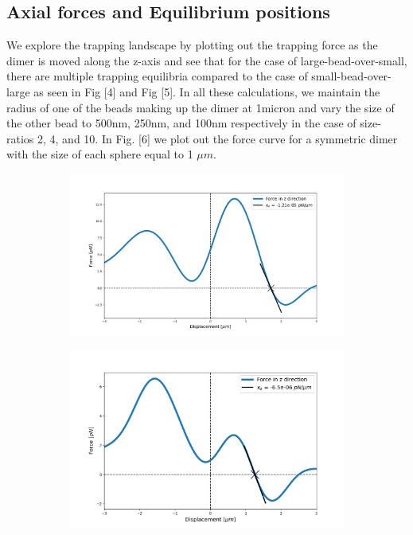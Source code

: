 \documentclass[preprint,  3p]{elsarticle}
\begin{document}
\subsection{Axial forces and Equilibrium positions}
We explore the trapping landscape by plotting out the trapping force as the dimer is moved along the z-axis and see that for the case of large-bead-over-small, there are multiple trapping equilibria compared to the case of small-bead-over-large as seen in Fig [4] and Fig [5]. In all these calculations, we maintain the radius of one of the beads making up the dimer at 1micron and vary the size of the other bead to 500nm, 250nm, and 100nm respectively in the case of size-ratios 2, 4, and 10. In Fig. [6] we plot out the force curve for a symmetric dimer with the size of each sphere equal to 1 $\mu m$.  
\begin{figure}
\begin{subfigure}{.475\linewidth}
	\includegraphics[width=\linewidth]{Images/lam=2_theta=0.png}
	\caption{}
	\label{lam=2}
\end{subfigure}\hfill %
\begin{subfigure}{.475\linewidth}
	\includegraphics[width=\linewidth]{Images/lam=4_theta=0.png}
	\caption{}
	\label{lam=4}
\end{subfigure}


\end{figure}
\end{document}
